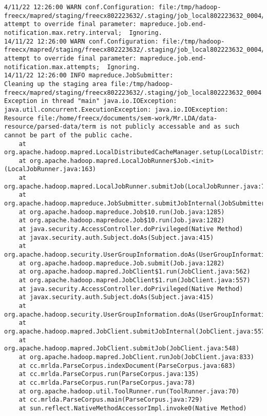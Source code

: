 \begin{verbatim}
4/11/22 12:26:00 WARN conf.Configuration: file:/tmp/hadoop-freecx/mapred/staging/freecx802223632/.staging/job_local802223632_0004/job.xml:an 
attempt to override final parameter: mapreduce.job.end-notification.max.retry.interval;  Ignoring.
14/11/22 12:26:00 WARN conf.Configuration: file:/tmp/hadoop-freecx/mapred/staging/freecx802223632/.staging/job_local802223632_0004/job.xml:an 
attempt to override final parameter: mapreduce.job.end-notification.max.attempts;  Ignoring.
14/11/22 12:26:00 INFO mapreduce.JobSubmitter: 
Cleaning up the staging area file:/tmp/hadoop-freecx/mapred/staging/freecx802223632/.staging/job_local802223632_0004
Exception in thread "main" java.io.IOException: java.util.concurrent.ExecutionException: java.io.IOException: 
Resource file:/home/freecx/documents/sem-work/Mr.LDA/data-resource/parsed-data/term is not publicly accessable and as such cannot be part of the public cache.
    at org.apache.hadoop.mapred.LocalDistributedCacheManager.setup(LocalDistributedCacheManager.java:149)
    at org.apache.hadoop.mapred.LocalJobRunner$Job.<init>(LocalJobRunner.java:163)
    at org.apache.hadoop.mapred.LocalJobRunner.submitJob(LocalJobRunner.java:731)
    at org.apache.hadoop.mapreduce.JobSubmitter.submitJobInternal(JobSubmitter.java:432)
    at org.apache.hadoop.mapreduce.Job$10.run(Job.java:1285)
    at org.apache.hadoop.mapreduce.Job$10.run(Job.java:1282)
    at java.security.AccessController.doPrivileged(Native Method)
    at javax.security.auth.Subject.doAs(Subject.java:415)
    at org.apache.hadoop.security.UserGroupInformation.doAs(UserGroupInformation.java:1614)
    at org.apache.hadoop.mapreduce.Job.submit(Job.java:1282)
    at org.apache.hadoop.mapred.JobClient$1.run(JobClient.java:562)
    at org.apache.hadoop.mapred.JobClient$1.run(JobClient.java:557)
    at java.security.AccessController.doPrivileged(Native Method)
    at javax.security.auth.Subject.doAs(Subject.java:415)
    at org.apache.hadoop.security.UserGroupInformation.doAs(UserGroupInformation.java:1614)
    at org.apache.hadoop.mapred.JobClient.submitJobInternal(JobClient.java:557)
    at org.apache.hadoop.mapred.JobClient.submitJob(JobClient.java:548)
    at org.apache.hadoop.mapred.JobClient.runJob(JobClient.java:833)
    at cc.mrlda.ParseCorpus.indexDocument(ParseCorpus.java:683)
    at cc.mrlda.ParseCorpus.run(ParseCorpus.java:135)
    at cc.mrlda.ParseCorpus.run(ParseCorpus.java:78)
    at org.apache.hadoop.util.ToolRunner.run(ToolRunner.java:70)
    at cc.mrlda.ParseCorpus.main(ParseCorpus.java:729)
    at sun.reflect.NativeMethodAccessorImpl.invoke0(Native Method)

\end{verbatim}

